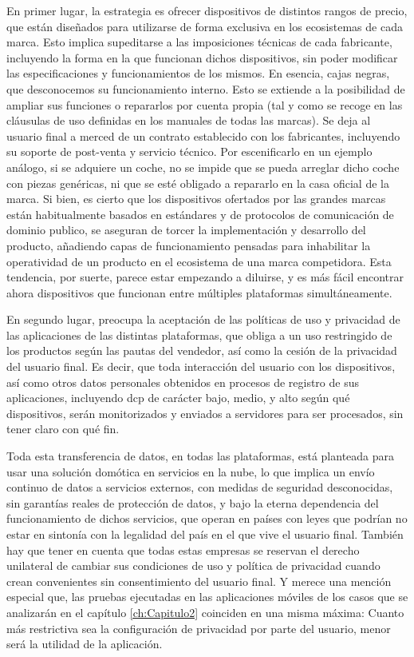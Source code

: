 En primer lugar, la estrategia es ofrecer dispositivos de distintos rangos de precio, que están diseñados para utilizarse de forma exclusiva en los ecosistemas de cada marca. Esto implica supeditarse a las imposiciones técnicas de cada fabricante, incluyendo la forma en la que funcionan dichos dispositivos, sin poder modificar las especificaciones y funcionamientos de los mismos. En esencia, cajas negras, que desconocemos su funcionamiento interno. Esto se extiende a la posibilidad de ampliar sus funciones o repararlos por cuenta propia (tal y como se recoge en las cláusulas de uso definidas en los manuales de todas las marcas). Se deja al usuario final a merced de un contrato establecido con los fabricantes, incluyendo su soporte de post-venta y servicio técnico. Por escenificarlo en un ejemplo análogo, si se adquiere un coche, no se impide que se pueda arreglar dicho coche con piezas genéricas, ni que se esté obligado a repararlo en la casa oficial de la marca. Si bien, es cierto que los dispositivos ofertados por las grandes marcas están habitualmente basados en estándares y de protocolos de comunicación de dominio publico, se aseguran de torcer la implementación y desarrollo del producto, añadiendo capas de funcionamiento pensadas para inhabilitar la operatividad de un producto en el ecosistema de una marca competidora. Esta tendencia, por suerte, parece estar empezando a diluirse, y es más fácil encontrar ahora dispositivos que funcionan entre múltiples plataformas simultáneamente.

\vspace{1cm}

En segundo lugar, preocupa la aceptación de las políticas de uso y privacidad de las aplicaciones de las distintas plataformas, que obliga a un uso restringido de los productos según las pautas del vendedor, así como la cesión de la privacidad del usuario final. Es decir, que toda interacción del usuario con los dispositivos, así como otros datos personales obtenidos en procesos de registro de sus aplicaciones, incluyendo \gls{dcp} de carácter bajo, medio, y alto según qué dispositivos, serán monitorizados y enviados a servidores para ser procesados, sin tener claro con qué fin.

\vspace{1cm}

Toda esta transferencia de datos, en todas las plataformas, está planteada para usar una solución domótica en servicios en la nube, lo que implica un envío continuo de datos a servicios externos, con medidas de seguridad desconocidas, sin garantías reales de protección de datos, y bajo la eterna dependencia del funcionamiento de dichos servicios, que operan en países con leyes que podrían no estar en sintonía con la legalidad del país en el que vive el usuario final. También hay que tener en cuenta que todas estas empresas se reservan el derecho unilateral de cambiar sus condiciones de uso y política de privacidad cuando crean convenientes sin consentimiento del usuario final. Y merece una mención especial que, las pruebas ejecutadas en las aplicaciones móviles de los casos que se analizarán en el capítulo \ref{ch:Capitulo2} coinciden en una misma máxima: Cuanto más restrictiva sea la configuración de privacidad por parte del usuario,
menor será la utilidad de la aplicación.

